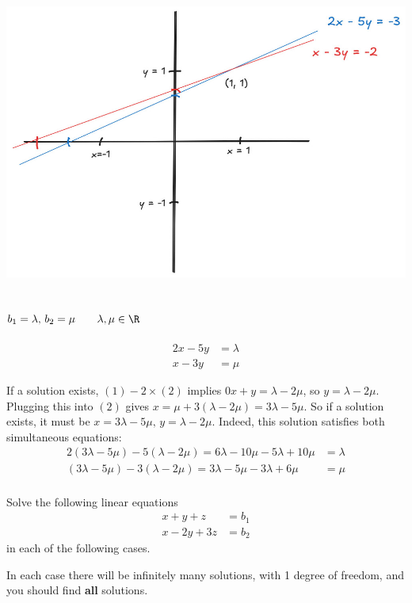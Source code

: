 \documentclass[a4paper]{article}
\begin{document}
\begin{center}\includegraphics[scale=0.35]{Q1b}\end{center}

\subsection{$b_1 = \lambda,\, b_2 = \mu \qquad \lambda, \mu \in \R$} %

\begin{align*}
2x - 5y &= \lambda \tag{1}\\
x - 3y &= \mu \tag{2}
\end{align*}

If a solution exists, $(1) - 2 \times (2)$ implies $0x + y = \lambda - 2\mu$, so $y=\lambda - 2\mu$. Plugging this into $(2)$ gives $x = \mu + 3(\lambda - 2\mu) = 3\lambda - 5\mu$.
So if a solution exists, it must be $x=3\lambda - 5\mu,\, y=\lambda - 2\mu$. Indeed, this solution satisfies both simultaneous equations:
\begin{align*}
2(3\lambda - 5\mu) - 5(\lambda - 2\mu) = 6\lambda - 10\mu - 5\lambda + 10\mu &= \lambda\\
(3\lambda - 5\mu) - 3(\lambda - 2\mu) = 3\lambda - 5\mu - 3\lambda + 6\mu &= \mu\\
\end{align*}


\begin{questionbody}
Solve the following linear equations 
\begin{align*}
x + y + z &= b_1\\
x - 2y + 3z &= b_2
\end{align*}
in each of the following cases.

In each case there will be infinitely many solutions, with 1 degree of freedom, and
you should find \textbf{all} solutions.
\end{questionbody}
\end{document}
